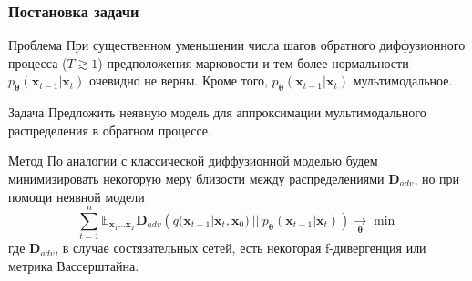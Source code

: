\documentclass[8pt]{beamer}
\begin{document}
\begin{frame}
	\frametitle{Постановка задачи}
		\begin{block}{Проблема}
			При существенном уменьшении числа шагов обратного диффузионного процесса ($T\gtrsim 1$) предположения марковости и тем более нормальности $p_{\boldsymbol{\theta}}(\textbf{x}_{t-1}|\textbf{x}_t)$ очевидно не верны. Кроме того, $p_{\boldsymbol{\theta}}(\textbf{x}_{t-1}|\textbf{x}_t)$ мультимодальное.
		\end{block}
	
		\begin{block}{Задача}
			Предложить неявную модель для аппроксимации мультимодального распределения в обратном процессе. 
		\end{block}
	
	\begin{block}{Метод}
			По аналогии с классической диффузионной моделью будем минимизировать некоторую меру близости между распределениями $\textbf{D}_{adv}$, но при помощи неявной модели
			 \begin{equation*}
			\sum\limits_{t=1}^n \mathbb{E}_{\textbf{x}_1\dots \textbf{x}_T} \textbf{D}_{adv}\left(q(\textbf{x}_{t-1}|\textbf{x}_t, \textbf{x}_0)~||~p_{\boldsymbol{\theta}}(\textbf{x}_{t-1}|\textbf{x}_t)  \right) \xrightarrow[{\boldsymbol{\theta}}]{}\min
		\end{equation*}
			где $\textbf{D}_{adv}$, в случае состязательных сетей, есть некоторая f-дивергенция или метрика Вассерштайна.
		\end{block}

\end{frame}
\end{document}
